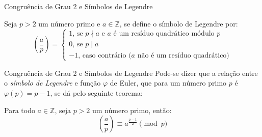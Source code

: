 \begin{frame}[fragile]{Congruência de Grau 2 e Símbolos de Legendre}
    \begin{definicao}
        Seja $p > 2$ um número primo e $a \in \mathbb{Z}$, se define o símbolo de Legendre por:
        \begin{equation*}
            \left( \frac{a}{p} \right) = \begin{cases}
                1 \text{, se $p \nmid a$ e $a$ é um resíduo quadrático módulo $p$}
                \\
                0 \text{, se $p \mid a$}
                \\
                -1 \text{, caso contrário ($a$ não é um resíduo quadrático)}
                \end{cases}
        \end{equation*}
    \end{definicao}
\end{frame}

\begin{frame}[fragile]{Congruência de Grau 2 e Símbolos de Legendre}
    Pode-se dizer que a relação entre o \textit{símbolo de Legendre} e função $\varphi$ de Euler, que para um número primo $p$ é $\varphi(p) = p - 1$, se dá pelo seguinte teorema:
    \begin{teorema} Para todo $a \in \mathbb{Z}$, seja $p > 2$ um número primo, então: \label{teorema:criteriodeeuler}
        \begin{equation*}
            \left( \frac{a}{p} \right) \equiv a^{\frac{p-1}{2}} \pmod p
        \end{equation*}
    \end{teorema}
\end{frame}

